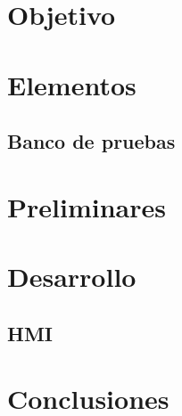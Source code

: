 \documentclass[12pt,a4paper]{article}
\begin{document}
\section{Objetivo}






\section{Elementos}


\subsection{Banco de pruebas}

\section{Preliminares}

	
\section{Desarrollo}





\subsection{HMI}


%

%



%



\section{Conclusiones}

\end{document}
